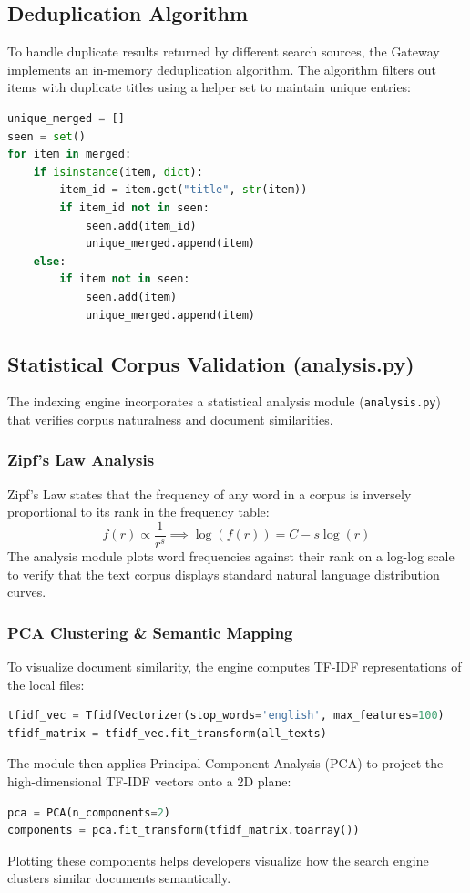 \documentclass[11pt,a4paper]{article}
\begin{document}
\subsection{Deduplication Algorithm}
To handle duplicate results returned by different search sources, the Gateway implements an in-memory deduplication algorithm. The algorithm filters out items with duplicate titles using a helper set to maintain unique entries:
\begin{lstlisting}[language=Python]
unique_merged = []
seen = set()
for item in merged:
    if isinstance(item, dict):
        item_id = item.get("title", str(item))
        if item_id not in seen:
            seen.add(item_id)
            unique_merged.append(item)
    else:
        if item not in seen:
            seen.add(item)
            unique_merged.append(item)
\end{lstlisting}

\subsection{Statistical Corpus Validation (analysis.py)}
The indexing engine incorporates a statistical analysis module (\texttt{analysis.py}) that verifies corpus naturalness and document similarities.

\subsubsection{Zipf's Law Analysis}
Zipf's Law states that the frequency of any word in a corpus is inversely proportional to its rank in the frequency table:
\begin{equation}
f(r) \propto \frac{1}{r^s} \implies \log(f(r)) = C - s \log(r)
\end{equation}
The analysis module plots word frequencies against their rank on a log-log scale to verify that the text corpus displays standard natural language distribution curves.

\subsubsection{PCA Clustering & Semantic Mapping}
To visualize document similarity, the engine computes TF-IDF representations of the local files:
\begin{lstlisting}[language=Python]
tfidf_vec = TfidfVectorizer(stop_words='english', max_features=100)
tfidf_matrix = tfidf_vec.fit_transform(all_texts)
\end{lstlisting}
The module then applies Principal Component Analysis (PCA) to project the high-dimensional TF-IDF vectors onto a 2D plane:
\begin{lstlisting}[language=Python]
pca = PCA(n_components=2)
components = pca.fit_transform(tfidf_matrix.toarray())
\end{lstlisting}
Plotting these components helps developers visualize how the search engine clusters similar documents semantically.
\end{document}
